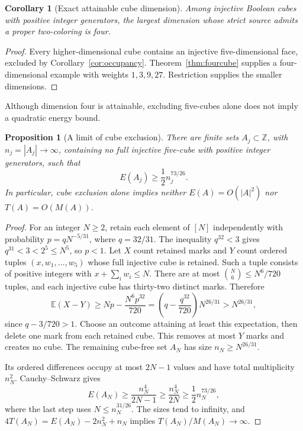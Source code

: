 \documentclass[11pt,a4paper]{article}
\newtheorem{proposition}[theorem]{Proposition}
\newtheorem{corollary}[theorem]{Corollary}
\theoremstyle{definition}
\newcommand{\Z}{\mathbb Z}
\numberwithin{equation}{section}
\begin{document}
\begin{corollary}[Exact attainable cube dimension]\label{cor:cube-threshold}
Among injective Boolean cubes with positive integer generators,
the largest dimension whose strict source admits a proper two-coloring
is four.
\end{corollary}
\begin{proof}
Every higher-dimensional cube contains an injective five-dimensional
face, excluded by Corollary~\ref{cor:occupancy}.
Theorem~\ref{thm:fourcube} supplies a four-dimensional example with
weights $1,3,9,27$. Restriction supplies the smaller dimensions.
\end{proof}

Although dimension four is attainable, excluding five-cubes alone does
not imply a quadratic energy bound.

\begin{proposition}[A limit of cube exclusion]\label{prop:cube-free-energy}
There are finite sets $A_j\subset\Z$, with $n_j=|A_j|\to\infty$,
containing no full injective five-cube with positive integer generators,
such that
\begin{equation}\label{eq:cube-free-energy}
E(A_j)\ge\frac12 n_j^{73/26}.
\end{equation}
In particular, cube exclusion alone implies neither
$E(A)=O(|A|^2)$ nor $T(A)=O(M(A))$.
\end{proposition}
\begin{proof}
For an integer $N\ge2$, retain each element of $[N]$ independently
with probability $p=qN^{-5/31}$, where $q=32/31$.
The inequality $q^{32}<3$ gives $q^{31}<3<2^5\le N^5$, so $p<1$.
Let $X$ count retained marks and $Y$ count ordered tuples
$(x,w_1,\ldots,w_5)$ whose full injective cube is retained.
Such a tuple consists of positive integers with $x+\sum_iw_i\le N$.
There are at most $\binom N6\le N^6/720$ tuples, and each injective
cube has thirty-two distinct marks. Therefore
\[
\mathbb E(X-Y)\ge Np-\frac{N^6p^{32}}{720}
=\left(q-\frac{q^{32}}{720}\right)N^{26/31}>N^{26/31},
\]
since $q-3/720>1$.
Choose an outcome attaining at least this expectation, then delete
one mark from each retained cube. This removes at most $Y$ marks
and creates no cube. The remaining cube-free set $A_N$
has size $n_N\ge N^{26/31}$.

Its ordered differences occupy at most $2N-1$ values and have total
multiplicity $n_N^2$. Cauchy--Schwarz gives
\[
E(A_N)\ge\frac{n_N^4}{2N-1}\ge\frac{n_N^4}{2N}
\ge\frac12 n_N^{73/26},
\]
where the last step uses $N\le n_N^{31/26}$.
The sizes tend to infinity, and
$4T(A_N)=E(A_N)-2n_N^2+n_N$ implies $T(A_N)/M(A_N)\to\infty$.
\end{proof}
\end{document}
